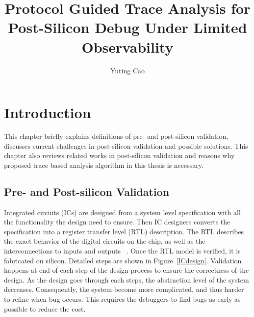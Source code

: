 \documentclass[12pt,frontmatter,copyright,thesis]{usfmanus}
\title{Protocol Guided Trace Analysis for Post-Silicon Debug Under Limited Observability}
\author{Yuting Cao}
\begin{document}
\setlength{\abovedisplayskip}{1pt}
\setlength{\belowdisplayskip}{2pt}
\chapter{Introduction}
This chapter briefly explains definitions of pre- and post-silicon validation,
discusses current challenges in post-silicon validation and possible
solutions. This chapter also reviews
related works in post-silicon validation and
reasons why proposed trace based analysis algorithm in this thesis is
necessary.
%
\section{Pre- and Post-silicon Validation}
Integrated circuits (ICs) are designed from
a system level specification with all the functionality
the design need to ensure. 
Then IC designers converts the specification
into a register transfer level (RTL) description. 
The RTL describes the exact behavior of the digital circuits on the chip, 
as well as the interconnections to inputs and outputs ~\cite{white2004process}.
Once the RTL model is verified, it is fabricated on silicon.
Detailed
steps
are
shown in Figure~\ref{ICdesign}. 
Validation happens at end of each step of the design process
to ensure the correctness of the design.
As the design goes through each steps, the abstraction level
of the system decreases. Consequently,
the system become more complicated, and thus
harder to refine when bug occurs. This requires
the debuggers to find bugs as early as
possible to reduce the cost.
\end{document}
